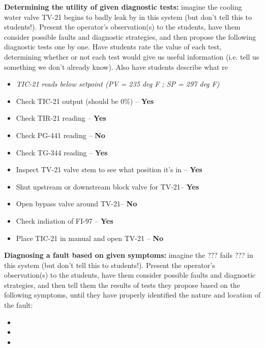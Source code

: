 \vskip 10pt


\noindent
{\bf Determining the utility of given diagnostic tests:} imagine the cooling water valve TV-21 begins to badly leak by in this system (but don't tell this to students!).  Present the operator's observation(s) to the students, have them consider possible faults and diagnostic strategies, and then propose the following diagnostic tests one by one.  Have students rate the value of each test, determining whether or not each test would give us useful information (i.e. tell us something we don't already know).  Also have students describe what re

\begin{itemize}
\item{} {\it TIC-21 reads below setpoint (PV = 235 deg F ; SP = 297 deg F)}
\item{} Check TIC-21 output (should be 0\%) -- {\bf Yes}
\item{} Check TIR-21 reading -- {\bf Yes}
\item{} Check PG-441 reading -- {\bf No}
\item{} Check TG-344 reading -- {\bf Yes}
\item{} Inspect TV-21 valve stem to see what position it's in -- {\bf Yes}
\item{} Shut upstream or downstream block valve for TV-21-- {\bf Yes}
\item{} Open bypass valve around TV-21-- {\bf No}
\item{} Check indiation of FI-97 -- {\bf Yes}
\item{} Place TIC-21 in manual and open TV-21 -- {\bf No}
\end{itemize}


\vskip 10pt


\noindent
{\bf Diagnosing a fault based on given symptoms:} imagine the ??? fails ??? in this system (but don't tell this to students!).  Present the operator's observation(s) to the students, have them consider possible faults and diagnostic strategies, and then tell them the results of tests they propose based on the following symptoms, until they have properly identified the nature and location of the fault:

\begin{itemize}
\item{} 
\item{} 
\item{} 
\end{itemize}






